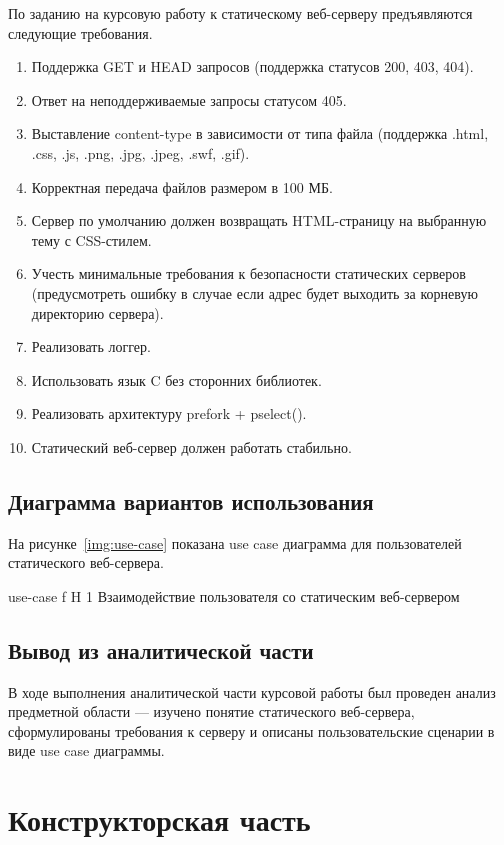\documentclass{bmstu}
\begin{document}
По заданию на курсовую работу к статическому веб-серверу предъявляются следующие требования.
\begin{enumerate}
\item Поддержка GET и HEAD запросов (поддержка статусов 200, 403, 404).
\item Ответ на неподдерживаемые запросы статусом 405.
\item Выставление content-type в зависимости от типа файла (поддержка .html, .css, .js, .png, .jpg, .jpeg, .swf, .gif).
\item Корректная передача файлов размером в 100 МБ.
\item Сервер по умолчанию должен возвращать HTML-страницу на выбранную тему с CSS-стилем.
\item Учесть минимальные требования к безопасности статических серверов (предусмотреть ошибку в случае если адрес будет выходить за корневую директорию сервера).
\item Реализовать логгер.
\item Использовать язык C без сторонних библиотек.
\item Реализовать архитектуру prefork + pselect().
\item Статический веб-сервер должен работать стабильно.
\end{enumerate}

\section{Диаграмма вариантов использования}

На рисунке~\ref{img:use-case} показана use case диаграмма для пользователей статического веб-сервера.

    {use-case}
    {f}
    {H}
    {1\textwidth}
    {Взаимодействие пользователя со статическим веб-сервером}

\section*{Вывод из аналитической части}

В ходе выполнения аналитической части курсовой работы был проведен анализ предметной области --- изучено понятие статического веб-сервера, сформулированы требования к серверу и описаны пользовательские сценарии в виде use case диаграммы.

\chapter{Конструкторская часть}
\end{document}
